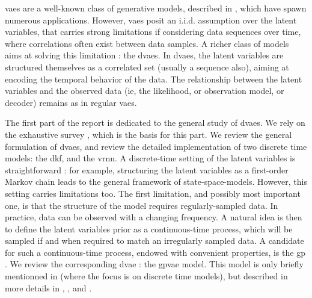 

\glspl{vae} are a well-known class of generative models, described in \cite{kingma_introduction_2019}, which have spawn numerous applications. 
However, \glspl{vae} posit an i.i.d. assumption over the latent variables, that carries strong limitations if considering data sequences over time, 
where correlations often exist between data samples. A richer class of models aims at solving this limitation : the \glspl{dvae}.
In \glspl{dvae}, the latent variables are structured themselves as a correlated set (usually a sequence also), 
aiming at encoding the temporal behavior of the data. The relationship between the latent variables and the observed data (ie, the likelihood, 
or observation model, or decoder) remains as in regular \glspl{vae}.

The first part of the report is dedicated to the general study of \glspl{dvae}. We rely on the exhaustive survey \cite{girin_dynamical_2022},
which is the basis for this part. We review the general formulation of \glspl{dvae}, and review the detailed implementation of two discrete time models:
 the \gls{dkf}, and the \gls{vrnn}. A discrete-time setting of the latent variables is straightforward : for example, 
 structuring the latent variables as a first-order Markov chain leads to the general framework of \glspl{state-space-model}.
 However, this setting carries limitations too. The first limitation, and possibly most important one, 
 is that the structure of the model requires regularly-sampled data. In practice, data can be observed with a changing frequency. 
 A natural idea is then to define the latent variables prior as a continuous-time process, which will be sampled if and when 
 required to match an irregularly sampled data. A candidate for such a continuous-time process, endowed with convenient properties, 
 is the \gls{gp} \cite{rasmussen_gaussian_2008}. We review the corresponding \gls{dvae} : the \gls{gpvae} model.
 This model is only briefly mentionned in \cite{girin_dynamical_2022} (where the focus is on discrete time models), 
 but described in more details in \cite{casale_gaussian_2018}, \cite{fortuin_gp-vae:_2020}, \cite{titsias_bayesian_2010} 
 and \cite{zhu_markovian_2023}. 

